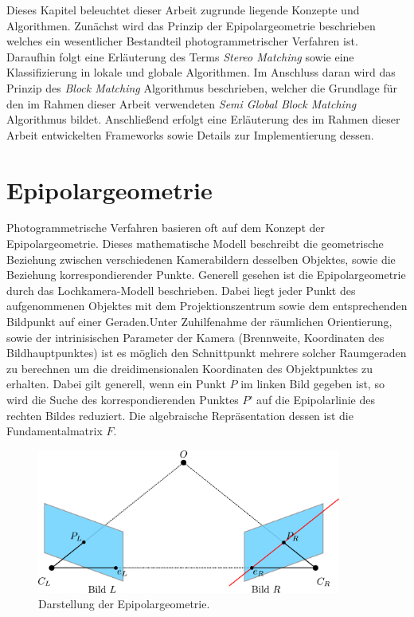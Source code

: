 Dieses Kapitel beleuchtet dieser Arbeit zugrunde liegende Konzepte und Algorithmen. Zunächst wird das Prinzip der Epipolargeometrie beschrieben welches ein wesentlicher Bestandteil photogrammetrischer Verfahren ist. Daraufhin folgt eine Erläuterung des Terms \emph{Stereo Matching} sowie eine Klassifizierung in lokale und globale Algorithmen. Im Anschluss daran wird das Prinzip des \emph{Block Matching} Algorithmus beschrieben, welcher die Grundlage für den im Rahmen dieser Arbeit verwendeten \emph{Semi Global Block Matching} Algorithmus bildet. Anschließend erfolgt eine Erläuterung des im Rahmen dieser Arbeit entwickelten Frameworks sowie Details zur Implementierung dessen.

\section{Epipolargeometrie}
\label{sec:epipolargeometrie}
Photogrammetrische Verfahren basieren oft auf dem Konzept der Epipolargeometrie. Dieses mathematische Modell beschreibt die geometrische Beziehung zwischen verschiedenen Kamerabildern desselben Objektes, sowie die Beziehung korrespondierender Punkte. Generell gesehen ist die Epipolargeometrie durch das Lochkamera-Modell beschrieben. Dabei liegt jeder Punkt des aufgenommenen Objektes mit dem Projektionszentrum sowie dem entsprechenden Bildpunkt auf einer Geraden.Unter Zuhilfenahme der räumlichen Orientierung, sowie der intrinisischen Parameter der Kamera (Brennweite, Koordinaten des Bildhauptpunktes) ist es möglich den Schnittpunkt mehrere solcher Raumgeraden zu berechnen um die dreidimensionalen Koordinaten des Objektpunktes zu erhalten. Dabei gilt generell, wenn ein Punkt $P$ im linken Bild gegeben ist, so wird die Suche des korrespondierenden Punktes $P’$ auf die Epipolarlinie des rechten Bildes reduziert. Die algebraische Repräsentation dessen ist die Fundamentalmatrix $F$. 

\begin{figure}[h]
	\begin{center}
		\includegraphics[width=10cm]{img/epipolar_geometry.pdf}
	\end{center}
	\caption{Darstellung der Epipolargeometrie.}
	\label{fig:epipolar_geometry}
\end{figure}

